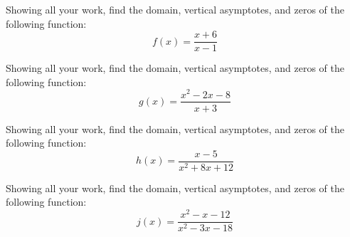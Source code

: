 \documentclass[11pt,letterpaper]{article}
\begin{document}

 Showing all your work, find the domain, vertical asymptotes, and zeros of the following function:
	\[
	f(x)= \dfrac{x + 6}{x - 1}
	\]





\newpage





 Showing all your work, find the domain, vertical asymptotes, and zeros of the following function:
	\[
	g(x)= \dfrac{x^2 - 2x - 8}{x + 3}
	\]





\newpage





 Showing all your work, find the domain, vertical asymptotes, and zeros of the following function:
	\[
	h(x)= \dfrac{x - 5}{x^2 + 8x + 12}
	\]





\newpage





 Showing all your work, find the domain, vertical asymptotes, and zeros of the following function:
	\[
	j(x)= \dfrac{x^2 - x - 12}{x^2 - 3x - 18}
	\]





\end{document}

